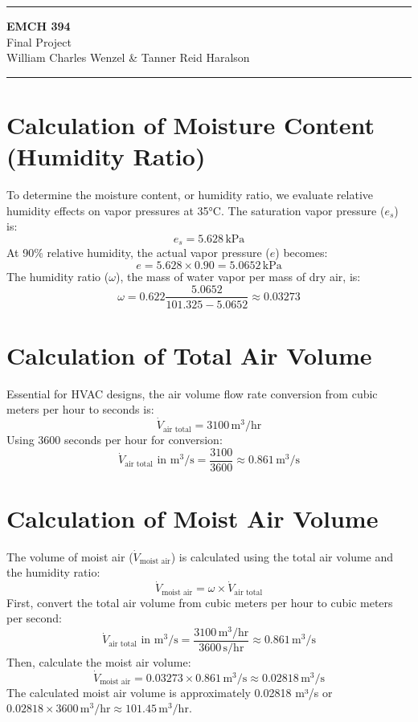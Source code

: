 \documentclass{article}
\begin{document}

\vspace{-1cm}
\hrule
\begin{center}
    \LARGE \textbf{EMCH 394} \\
    \Large Final Project \\
    \large William Charles Wenzel \& Tanner Reid Haralson
\end{center}

\hrule
\vspace{0.2cm}

\section{Calculation of Moisture Content (Humidity Ratio)}

To determine the moisture content, or humidity ratio, we evaluate relative humidity effects on vapor pressures at 35°C. The saturation vapor pressure ($e_s$) is:
\[ e_s = 5.628 \, \text{kPa} \]
At 90\% relative humidity, the actual vapor pressure ($e$) becomes:
\[ e = 5.628 \times 0.90 = 5.0652 \, \text{kPa} \]
The humidity ratio ($\omega$), the mass of water vapor per mass of dry air, is:
\[ \omega = 0.622 \frac{5.0652}{101.325 - 5.0652} \approx 0.03273 \]

\section{Calculation of Total Air Volume}

Essential for HVAC designs, the air volume flow rate conversion from cubic meters per hour to seconds is:
\[ \dot{V}_{\text{air total}} = 3100 \, \text{m}^3/\text{hr} \]
Using 3600 seconds per hour for conversion:
\[ \dot{V}_{\text{air total}} \text{ in m}^3/\text{s} = \frac{3100}{3600} \approx 0.861 \, \text{m}^3/\text{s} \]

\section{Calculation of Moist Air Volume}
The volume of moist air (\( \dot{V}_{\text{moist air}} \)) is calculated using the total air volume and the humidity ratio:
\[ \dot{V}_{\text{moist air}} = \omega \times \dot{V}_{\text{air total}} \]
\noindent
First, convert the total air volume from cubic meters per hour to cubic meters per second:
\[ \dot{V}_{\text{air total}} \text{ in m}^3/\text{s} = \frac{3100 \, \text{m}^3/\text{hr}}{3600 \, \text{s/hr}} \approx 0.861 \, \text{m}^3/\text{s} \]
\noindent
Then, calculate the moist air volume:
\[ \dot{V}_{\text{moist air}} = 0.03273 \times 0.861 \, \text{m}^3/\text{s} \approx 0.02818 \, \text{m}^3/\text{s} \]
\noindent
The calculated moist air volume is approximately 0.02818 m³/s or \( 0.02818 \times 3600 \, \text{m}^3/\text{hr} \approx 101.45 \, \text{m}^3/\text{hr} \).
\end{document}

